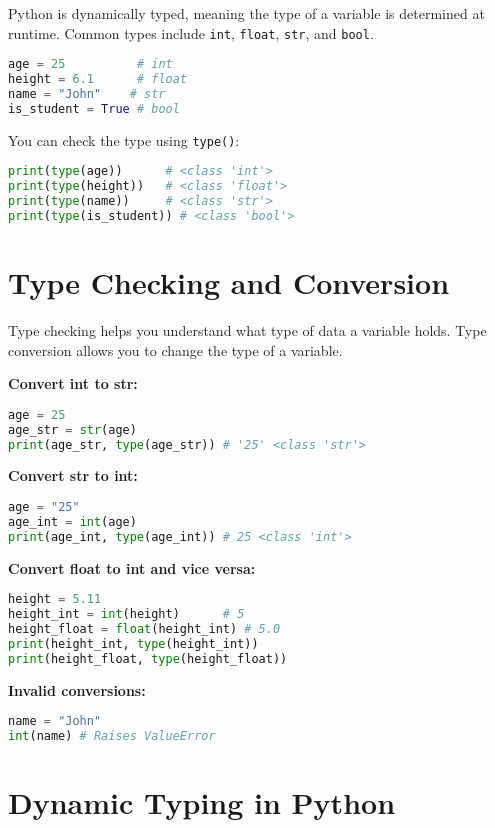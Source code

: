 Python is dynamically typed, meaning the type of a variable is determined at runtime.  
Common types include \texttt{int}, \texttt{float}, \texttt{str}, and \texttt{bool}.

\begin{lstlisting}[language=Python]
age = 25          # int
height = 6.1      # float
name = "John"    # str
is_student = True # bool
\end{lstlisting}

You can check the type using \texttt{type()}:

\begin{lstlisting}[language=Python]
print(type(age))      # <class 'int'>
print(type(height))   # <class 'float'>
print(type(name))     # <class 'str'>
print(type(is_student)) # <class 'bool'>
\end{lstlisting}

\section{Type Checking and Conversion}

Type checking helps you understand what type of data a variable holds.  
Type conversion allows you to change the type of a variable.

\textbf{Convert int to str:}
\begin{lstlisting}[language=Python]
age = 25
age_str = str(age)
print(age_str, type(age_str)) # '25' <class 'str'>
\end{lstlisting}

\textbf{Convert str to int:}
\begin{lstlisting}[language=Python]
age = "25"
age_int = int(age)
print(age_int, type(age_int)) # 25 <class 'int'>
\end{lstlisting}

\textbf{Convert float to int and vice versa:}
\begin{lstlisting}[language=Python]
height = 5.11
height_int = int(height)      # 5
height_float = float(height_int) # 5.0
print(height_int, type(height_int))
print(height_float, type(height_float))
\end{lstlisting}

\textbf{Invalid conversions:}
\begin{lstlisting}[language=Python]
name = "John"
int(name) # Raises ValueError
\end{lstlisting}

\section{Dynamic Typing in Python}

